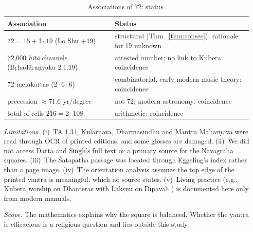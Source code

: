 \documentclass[journal]{IEEEtran}
\theoremstyle{definition}
\begin{document}
\begin{table}[t]
\caption{Associations of 72: status.}
\label{tab:72}
\centering\footnotesize
\setlength{\tabcolsep}{2pt}
\begin{tabular}{@{}p{}p{}@{}}
\toprule
Association & Status\\
\midrule
$72=15+3\cdot19$ (Lo Shu $+19$) & structural (Thm.~\ref{thm:consec}); rationale for 19 unknown\\
72{,}000 \emph{hit\=a} channels (B\d rhad\=ara\d nyaka 2.1.19) \cite{gretil_bau} & attested number; no link to Kubera: coincidence\\
72 mela\-kartas ($2\cdot6\cdot6$) & combinatorial, early-modern music theory: coincidence\\
precession $\approx71.6$ yr/degree & not 72; modern astronomy: coincidence\\
total of cells $216=2\cdot108$ & arithmetic: coincidence\\
\bottomrule
\end{tabular}
\end{table}

\emph{Limitations.} (i)~TA 1.31, Kul\=ar\d nava, Dharmasindhu and Mantra Mah\=ar\d nava were read through OCR of printed editions, and some glosses are damaged. (ii)~We did not access Datta and Singh's full text \cite{datta1992} or a primary source for the Navagraha squares. (iii)~The \'Satapatha passage was located through Eggeling's index rather than a page image. (iv)~The orientation analysis assumes the top edge of the printed yantra is meaningful, which no source states. (v)~Living practice (e.g., Kubera worship on Dhanteras with Lak\d sm\=\i{} on D\=\i p\=aval\=\i{} \cite{drik_kubera_puja}) is documented here only from modern manuals.

\emph{Scope.} The mathematics explains why the square is balanced. Whether the yantra is efficacious is a religious question and lies outside this study.
\end{document}
